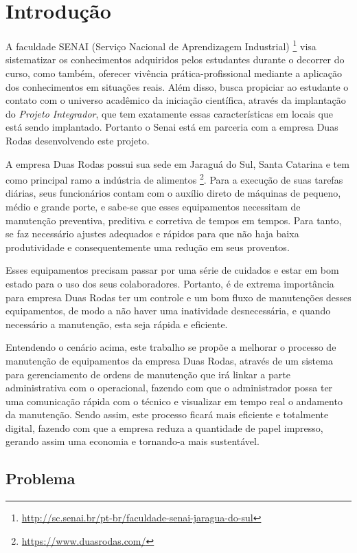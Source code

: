 \chapter{Introdução}

{A faculdade SENAI (Serviço Nacional de Aprendizagem Industrial) \footnote{\url{http://sc.senai.br/pt-br/faculdade-senai-jaragua-do-sul}}  visa sistematizar os conhecimentos adquiridos pelos estudantes durante o decorrer do curso, como também, oferecer vivência  prática-profissional mediante a aplicação dos conhecimentos em situações reais. Além disso, busca  propiciar ao estudante o contato com o universo acadêmico da iniciação científica, através da implantação do \textit{Projeto Integrador}, que tem exatamente essas características em locais que está sendo implantado. Portanto o Senai está em parceria com a empresa Duas Rodas desenvolvendo este projeto. }



A empresa Duas Rodas possui sua sede em Jaraguá do Sul, Santa Catarina e tem como principal ramo a indústria de alimentos \footnote{\url{ https://www.duasrodas.com/}}. Para a execução de suas tarefas diárias, seus funcionários contam com o auxílio direto de máquinas de pequeno, médio e grande porte, e sabe-se que esses equipamentos necessitam de manutenção preventiva, preditiva e corretiva  de tempos em tempos. Para tanto, se faz necessário ajustes adequados e rápidos para que não haja baixa produtividade e consequentemente uma redução em seus proventos.

Esses equipamentos precisam passar por uma série de cuidados e estar em bom estado para o uso dos seus colaboradores. Portanto, é de extrema importância para empresa Duas Rodas ter um controle e um bom fluxo de manutenções desses equipamentos, de modo a não haver uma inatividade desnecessária, e quando necessário a manutenção, esta seja rápida e eficiente.

Entendendo o cenário acima, este trabalho se propõe a melhorar o processo de manutenção de equipamentos da empresa Duas Rodas, através de um sistema para gerenciamento de ordens de manutenção que irá linkar a parte administrativa com o operacional, fazendo com que o administrador possa ter uma comunicação rápida com o técnico e visualizar em tempo real o andamento da manutenção. Sendo assim, este processo ficará mais eficiente e totalmente digital, fazendo com que a empresa reduza a quantidade de papel impresso, gerando assim uma economia e tornando-a mais sustentável.

\section{Problema}

